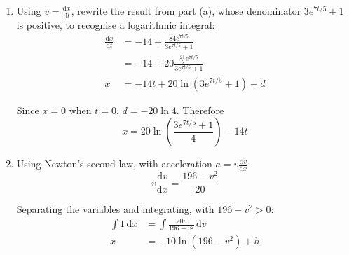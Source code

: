 \documentclass[leqno]{article}
\begin{document}
\begin{enumerate}[
  label=\textbf{\arabic*.},
  leftmargin=*,
  topsep=0pt,
  partopsep=0pt,
  parsep=0pt
]
\begin{djsSolution}
\begin{enumerate}[label=\textbf{(\alph*)}, start=1]
The terminal speed is \(14\,\mathrm{m\,s^{-1}}\). Since the initial speed is \(7\,\mathrm{m\,s^{-1}}\), the speed increases towards \(14\,\mathrm{m\,s^{-1}}\) and remains below it, so \(14+v\) and \(14-v\) are both positive.

Separating the variables and using partial fractions:
\begin{align*}
\int\frac{1}{196-v^2}\,\mathrm{d}v &= \frac{1}{20}\int 1\,\mathrm{d}t \\
\frac{1}{28}\int\left(\frac{1}{14-v}+\frac{1}{14+v}\right)\mathrm{d}v &= \frac{t}{20}+c \\
\frac{1}{28}\left(\ln(14+v)-\ln(14-v)\right) &= \frac{t}{20}+c
\end{align*}

Using \(v=7\) when \(t=0\):
\[
c=\frac{1}{28}\ln\left(\frac{21}{7}\right)=\frac{\ln 3}{28}
\]

Hence
\begin{align*}
\ln\left(\frac{14+v}{14-v}\right) &= \frac{7t}{5}+\ln 3 \\
\frac{14+v}{14-v} &= 3e^{7t/5} \\
14+v &= 42e^{7t/5}-3ve^{7t/5} \\
v\left(1+3e^{7t/5}\right) &= 14\left(3e^{7t/5}-1\right) \\
v &= \frac{14\left(3e^{7t/5}-1\right)}{3e^{7t/5}+1}
\end{align*}

\item Using \(v=\frac{\mathrm{d}x}{\mathrm{d}t}\), rewrite the result from part (a), whose denominator \(3e^{7t/5}+1\) is positive, to recognise a logarithmic integral:
\begin{align*}
\frac{\mathrm{d}x}{\mathrm{d}t}
&= -14+\frac{84e^{7t/5}}{3e^{7t/5}+1} \\
&= -14+20\frac{\frac{21}{5}e^{7t/5}}{3e^{7t/5}+1} \\
x &= -14t+20\ln\left(3e^{7t/5}+1\right)+d
\end{align*}

Since \(x=0\) when \(t=0\), \(d=-20\ln 4\). Therefore
\[
x=20\ln\left(\frac{3e^{7t/5}+1}{4}\right)-14t
\]

\item Using Newton's second law, with acceleration \(a=v\frac{\mathrm{d}v}{\mathrm{d}x}\):
\[
v\frac{\mathrm{d}v}{\mathrm{d}x}=\frac{196-v^2}{20}
\]

Separating the variables and integrating, with \(196-v^2>0\):
\begin{align*}
\int 1\,\mathrm{d}x &= \int\frac{20v}{196-v^2}\,\mathrm{d}v \\
x &= -10\ln(196-v^2)+h
\end{align*}


\end{enumerate}
\end{djsSolution}
\end{enumerate}
\end{document}
